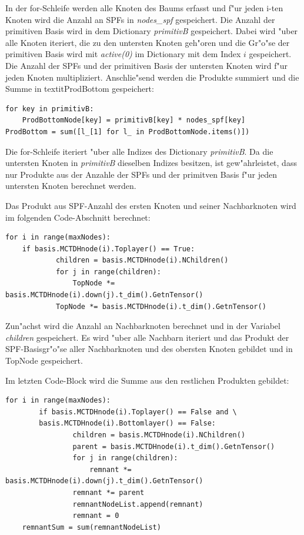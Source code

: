 In der for-Schleife werden alle Knoten des Baums erfasst und f"ur jeden i-ten Knoten 
wird die Anzahl an SPFs in \textit{nodes\_spf} gespeichert.
Die Anzahl der primitiven Basis wird in dem Dictionary \textit{primitivB} gespeichert.
Dabei wird "uber alle Knoten iteriert, die zu den untersten Knoten geh"oren und
die Gr"o"se der primitiven Basis wird mit \textit{active(0)} im Dictionary mit dem Index
$i$ gespeichert.
Die Anzahl der SPFs und der primitiven Basis der untersten Knoten wird f"ur jeden Knoten
multipliziert.
Anschlie"send werden die Produkte summiert und die Summe in textit{ProdBottom} gespeichert:

\begin{verbatim}
for key in primitivB:
    ProdBottomNode[key] = primitivB[key] * nodes_spf[key]
ProdBottom = sum([l_[1] for l_ in ProdBottomNode.items()])
\end{verbatim}

Die for-Schleife iteriert "uber alle Indizes des Dictionary \textit{primitivB}.
Da die untersten Knoten in \textit{primitivB} dieselben Indizes besitzen, ist
gew"ahrleistet, dass nur Produkte aus der Anzahle der SPFs und der primitven Basis 
f"ur jeden untersten Knoten berechnet werden.

Das Produkt aus SPF-Anzahl des ersten Knoten und seiner Nachbarknoten wird im folgenden
Code-Abschnitt berechnet:

\begin{verbatim}
for i in range(maxNodes):
    if basis.MCTDHnode(i).Toplayer() == True:
            children = basis.MCTDHnode(i).NChildren()
            for j in range(children):
                TopNode *= basis.MCTDHnode(i).down(j).t_dim().GetnTensor()
            TopNode *= basis.MCTDHnode(i).t_dim().GetnTensor()
\end{verbatim}

Zun"achst wird die Anzahl an Nachbarknoten berechnet und in der Variabel \textit{children} gespeichert.
Es wird "uber alle Nachbarn iteriert und das Produkt der SPF-Basisgr"o"se aller Nachbarknoten
 und des obersten Knoten gebildet und in TopNode gespeichert.

Im letzten Code-Block wird die Summe aus den restlichen Produkten gebildet:

\begin{verbatim}
for i in range(maxNodes):
        if basis.MCTDHnode(i).Toplayer() == False and \
        basis.MCTDHnode(i).Bottomlayer() == False:
                children = basis.MCTDHnode(i).NChildren()
                parent = basis.MCTDHnode(i).t_dim().GetnTensor()
                for j in range(children):
                    remnant *= basis.MCTDHnode(i).down(j).t_dim().GetnTensor() 
                remnant *= parent
                remnantNodeList.append(remnant)
                remnant = 0
    remnantSum = sum(remnantNodeList)
\end{verbatim}

